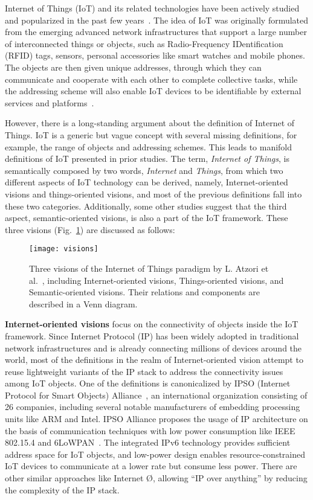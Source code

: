 Internet of Things (IoT) and its related technologies have been actively studied and popularized in the past few years~\cite{DBLP:journals/jnca/AlabaOHA17}. The idea of IoT was originally formulated from the emerging advanced network infrastructures that support a large number of interconnected things or objects, such as Radio-Frequency IDentification (RFID) tags, sensors, personal accessories like smart watches and mobile phones. The objects are then given unique addresses, through which they can communicate and cooperate with each other to complete collective tasks, while the addressing scheme will also enable IoT devices to be identifiable by external services and platforms~\cite{giusto2010internet}\cite{tan2010future}.

However, there is a long-standing argument about the definition of  Internet of Things. IoT is a generic but vague concept with several missing definitions, for example, the range of objects and addressing schemes. This leads to manifold definitions of IoT presented in prior studies. The term, \textit{Internet of Things}, is semantically composed by two words, \textit{Internet} and \textit{Things}, from which two different aspects of IoT technology can be derived, namely, Internet-oriented visions and things-oriented visions, and most of the previous definitions fall into these two categories. Additionally, some other studies suggest that the third aspect, semantic-oriented visions, is also a part of the IoT framework. These three visions (Fig.~\ref{fig:visions}) are discussed as follows:

\begin{figure}[htbp]
	\centering
  	\texttt{[image: visions]}
  	\caption{Three visions of the Internet of Things paradigm by L. Atzori et al.~\cite{DBLP:journals/jnca/AlabaOHA17}, including Internet-oriented visions, Things-oriented visions, and Semantic-oriented visions. Their relations and components are  described in a Venn diagram.}
  	\label{fig:visions}
\end{figure}

\textbf{Internet-oriented visions} focus on the connectivity of objects inside the IoT framework. Since Internet Protocol (IP) has been widely adopted in traditional network infrastructures and is already connecting millions of devices around the world, most of the definitions in the realm of Internet-oriented vision attempt to reuse lightweight variants of the IP stack to address the connectivity issues among IoT objects. One of the definitions is canonicalized by IPSO (Internet Protocol for Smart Objects) Alliance~\cite{vasseur2008ip}, an international organization consisting of 26 companies, including several notable manufacturers of embedding processing units like ARM and Intel. IPSO Alliance proposes the usage of IP architecture on the basis of communication techniques with low power consumption like IEEE 802.15.4 and 6LoWPAN~\cite{culler20096lowpan}. The integrated IPv6 technology  provides sufficient address space for IoT objects, and low-power design enables resource-constrained IoT devices to communicate at a lower rate but consume less power. There are other similar approaches like Internet {\O}, allowing ``IP over anything'' by reducing the complexity of the IP stack.

